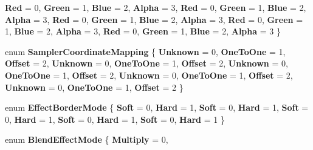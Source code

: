 \begin{DoxyCompactItemize}
{\bfseries Red} = 0, 
{\bfseries Green} = 1, 
{\bfseries Blue} = 2, 
{\bfseries Alpha} = 3, 
\newline
{\bfseries Red} = 0, 
{\bfseries Green} = 1, 
{\bfseries Blue} = 2, 
{\bfseries Alpha} = 3, 
\newline
{\bfseries Red} = 0, 
{\bfseries Green} = 1, 
{\bfseries Blue} = 2, 
{\bfseries Alpha} = 3, 
\newline
{\bfseries Red} = 0, 
{\bfseries Green} = 1, 
{\bfseries Blue} = 2, 
{\bfseries Alpha} = 3, 
\newline
{\bfseries Red} = 0, 
{\bfseries Green} = 1, 
{\bfseries Blue} = 2, 
{\bfseries Alpha} = 3
 \}
\item 
\mbox{\label{namespace_microsoft_1_1_graphics_1_1_canvas_1_1_effects_aee19f17bf119d8ef07f460eb2da92efe}} 
enum {\bfseries Sampler\+Coordinate\+Mapping} \{ \newline
{\bfseries Unknown} = 0, 
{\bfseries One\+To\+One} = 1, 
{\bfseries Offset} = 2, 
{\bfseries Unknown} = 0, 
\newline
{\bfseries One\+To\+One} = 1, 
{\bfseries Offset} = 2, 
{\bfseries Unknown} = 0, 
{\bfseries One\+To\+One} = 1, 
\newline
{\bfseries Offset} = 2, 
{\bfseries Unknown} = 0, 
{\bfseries One\+To\+One} = 1, 
{\bfseries Offset} = 2, 
\newline
{\bfseries Unknown} = 0, 
{\bfseries One\+To\+One} = 1, 
{\bfseries Offset} = 2
 \}
\item 
\mbox{\label{namespace_microsoft_1_1_graphics_1_1_canvas_1_1_effects_af071f1b230fa4fc760f6db8e5ad7d9db}} 
enum {\bfseries Effect\+Border\+Mode} \{ \newline
{\bfseries Soft} = 0, 
{\bfseries Hard} = 1, 
{\bfseries Soft} = 0, 
{\bfseries Hard} = 1, 
\newline
{\bfseries Soft} = 0, 
{\bfseries Hard} = 1, 
{\bfseries Soft} = 0, 
{\bfseries Hard} = 1, 
\newline
{\bfseries Soft} = 0, 
{\bfseries Hard} = 1
 \}
\item 
\mbox{\label{namespace_microsoft_1_1_graphics_1_1_canvas_1_1_effects_a2cba8d6181059b5f496c6734b739752e}} 
enum {\bfseries Blend\+Effect\+Mode} \{ \newline
{\bfseries Multiply} = 0, 

\end{DoxyCompactItemize}
